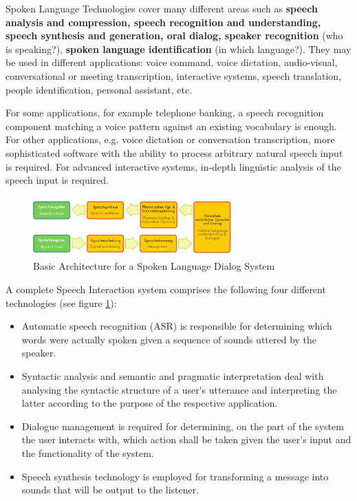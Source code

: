 \documentclass[]{../metanetpaper}
\begin{document}
\begin{multicols}{2}
Spoken Language Technologies cover many different areas such as 
{\bf speech analysis and compression, speech recognition and
  understanding, speech synthesis and generation, oral dialog, speaker
  recognition} (who is speaking?), {\bf spoken language
  identification} (in which language?). They may be used in different
applications: voice command, voice dictation, audio-visual,
conversational or meeting transcription, interactive systems, speech
translation, people identification, personal assistant, etc.

For some applications, for example telephone banking, a speech
recognition component matching a voice pattern against an existing
vocabulary is enough. For other applications, e.g. voice dictation or
conversation transcription, more sophisticated software with the
ability to process arbitrary natural speech input is required. For
advanced interactive systems, in-depth linguistic analysis of the
speech input is required.


\begin{figure}
\begin{center}
 \includegraphics[width=3.0in]{../_media/simple_speech-based_dialogue_architecture} 
\caption{Basic Architecture for a Spoken Language Dialog System}
\label{fig:sldsEng}
\end{center}
\end{figure}

A complete Speech Interaction system comprises the following four
different technologies (see figure \ref{fig:sldsEng}):
\begin{itemize}
\item Automatic speech recognition (ASR) is responsible for
  determining which words were actually spoken given a sequence of
  sounds uttered by the speaker.
\item Syntactic analysis and semantic and pragmatic interpretation
  deal with analysing the syntactic structure of a user{\mbox '}s utterance
  and interpreting the latter according to the purpose of the
  respective application.
\item Dialogue management is required for determining, on the part of
  the system the user interacts with, which action shall be taken
  given the user{\mbox '}s input and the functionality of the system.
\item Speech synthesis technology is employed for transforming a
  message into sounds that will be output to the listener.
\end{itemize}


\end{multicols}
\end{document}
